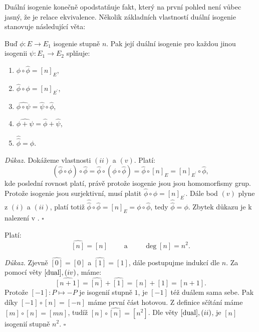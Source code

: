 \documentclass [12pt]{report}
\begin{document}
Duální isogenie konečně opodstatňuje fakt, který na první pohled není vůbec jasný, že  je relace ekvivalence. Několik základních vlastností duální isogenie stanovuje následující věta:

\begin{veta}\label{dual}
Buď $\phi: E \longrightarrow E_1$ isogenie stupně $n$. Pak její duální isogenie pro každou jinou isogenii $\psi:E_1 \longrightarrow E_2$ splňuje:
\begin{enumerate}
\item $\phi \circ \hat{\phi} = [n]_E$,
\item $\hat{\phi} \circ \phi = [n]_{E^\prime}$,
\item $\widehat{\phi \circ \psi} = \hat{\psi} \circ \hat{\phi}$,
\item $\widehat{\phi + \psi} = \hat{\phi} + \hat{\psi}$,
\item $\hat{\hat{\phi} } = \phi $.
\end{enumerate} 
\end{veta}

\noindent \textit{Důkaz.} Dokážeme vlastnosti $(ii)$ a $(v)$. Platí:
\begin{equation*}
(\hat{\phi} \circ \phi) \circ \hat{\phi} = \hat{\phi} \circ (\phi \circ \hat{\phi}) = \hat{\phi} \circ [n]_{E} = [n]_{E^\prime} \circ \hat{\phi},
\end{equation*}
kde poslední rovnost platí, právě protože isogenie jsou jsou homomorfismy grup. Protože isogenie jsou surjektivní, musí platit $\hat{\phi} \circ \phi = [n]_{E^\prime}$. Dále bod $(v)$ plyne z $(i)$ a $(ii)$, platí totiž $\hat{ \hat{\phi}} \circ \hat{\phi}  = [n]_{E} = \phi \circ \hat{\phi}$, tedy $\hat{\hat{\phi}} = \phi$. Zbytek důkazu je k nalezení v \cite[Thm. III.6.1]{Silverman}. \hfill $\square$\\

\begin{lemma}\label{deg}
Platí:
\begin{equation*}
\widehat{[n]} = [n] \qquad \text{ a } \qquad \deg [n] = n^2.
\end{equation*}
\end{lemma}
\noindent \textit{Důkaz. } Zjevně $\widehat{[0]} = [0]$ a $\widehat{[1]} = [1]$, dále postupujme indukcí dle $n$. Za pomocí věty $\ref{dual}, (iv)$, máme:
\begin{equation*}
\widehat{[n+1]} =  \widehat{[n]} + \widehat{[1]} = [n]+[1] = [n+1].
\end{equation*} 
Protože $[-1] : P \mapsto - P$ je isogenií stupně $1$, je $[-1]$ též duálem sama sebe. Pak díky $[-1] \circ [n] = [-n]$ máme první část hotovou. Z definice sčítání máme $[m] \circ [n] = [mn]$, tudíž $[n] \circ \widehat{[n]} = [n^2]$. Dle věty $\ref{dual}, (ii)$, je $[n]$ isogenií stupně $n^2$. \hfill $\square$\\
\end{document}
